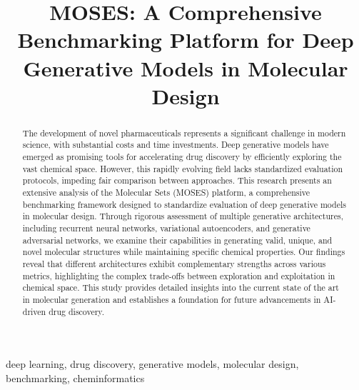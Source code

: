 \documentclass[conference]{IEEEtran}
\begin{document}
\title{MOSES: A Comprehensive Benchmarking Platform for Deep Generative Models in Molecular Design}

\author{
\and
{}
}

\maketitle

\begin{abstract}
The development of novel pharmaceuticals represents a significant challenge in modern science, with substantial costs and time investments. Deep generative models have emerged as promising tools for accelerating drug discovery by efficiently exploring the vast chemical space. However, this rapidly evolving field lacks standardized evaluation protocols, impeding fair comparison between approaches. This research presents an extensive analysis of the Molecular Sets (MOSES) platform, a comprehensive benchmarking framework designed to standardize evaluation of deep generative models in molecular design. Through rigorous assessment of multiple generative architectures, including recurrent neural networks, variational autoencoders, and generative adversarial networks, we examine their capabilities in generating valid, unique, and novel molecular structures while maintaining specific chemical properties. Our findings reveal that different architectures exhibit complementary strengths across various metrics, highlighting the complex trade-offs between exploration and exploitation in chemical space. This study provides detailed insights into the current state of the art in molecular generation and establishes a foundation for future advancements in AI-driven drug discovery.
\end{abstract}

\begin{IEEEkeywords}
deep learning, drug discovery, generative models, molecular design, benchmarking, cheminformatics
\end{IEEEkeywords}
\end{document}
